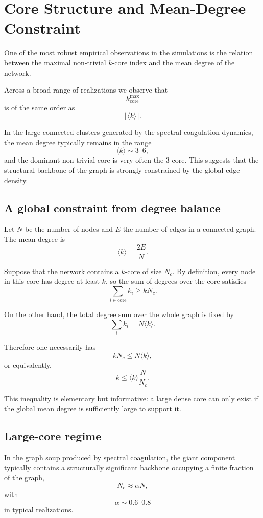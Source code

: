 \documentclass[11pt]{article}
\begin{document}
\section{Core Structure and Mean-Degree Constraint}

One of the most robust empirical observations in the simulations is the relation between the maximal non-trivial $k$-core index and the mean degree of the network.

Across a broad range of realizations we observe that
\[
k_{\mathrm{core}}^{\max}
\]
is of the same order as
\[
\lfloor \langle k\rangle \rfloor .
\]

In the large connected clusters generated by the spectral coagulation dynamics, the mean degree typically remains in the range
\[
\langle k\rangle \sim 3\text{--}6,
\]
and the dominant non-trivial core is very often the $3$-core.
This suggests that the structural backbone of the graph is strongly constrained by the global edge density.

\subsection{A global constraint from degree balance}

Let $N$ be the number of nodes and $E$ the number of edges in a connected graph.
The mean degree is
\[
\langle k\rangle = \frac{2E}{N}.
\]

Suppose that the network contains a $k$-core of size $N_c$.
By definition, every node in this core has degree at least $k$, so the sum of degrees over the core satisfies
\[
\sum_{i\in\mathrm{core}} k_i \ge kN_c.
\]

On the other hand, the total degree sum over the whole graph is fixed by
\[
\sum_i k_i = N\langle k\rangle.
\]

Therefore one necessarily has
\[
kN_c \le N\langle k\rangle,
\]
or equivalently,
\[
k \le \langle k\rangle \frac{N}{N_c}.
\]

This inequality is elementary but informative: a large dense core can only exist if the global mean degree is sufficiently large to support it.

\subsection{Large-core regime}

In the graph soup produced by spectral coagulation, the giant component typically contains a structurally significant backbone occupying a finite fraction of the graph,
\[
N_c \approx \alpha N,
\]
with
\[
\alpha \sim 0.6\text{--}0.8
\]
in typical realizations.
\end{document}
